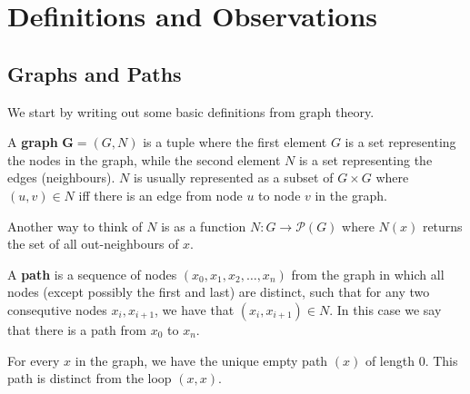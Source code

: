 \section{Definitions and Observations}
\label{sec:Definitions and Observations}
\subsection{Graphs and Paths}
\label{sub:Graphs and Paths}
We start by writing out some basic definitions from graph theory.
\begin{definition}
  A \textbf{graph} $\bm{G} = (G, N)$ is a tuple where the first element $G$ is a set representing the nodes in the graph, while the second element $N$ is a set representing the edges (neighbours).
  $N$ is usually represented as a subset of $G \times G$ where $(u,v) \in N$ iff there is an edge from node $u$ to node $v$ in the graph.
\end{definition}
Another way to think of $N$ is as a function $N: G \rightarrow \mathcal{P}(G)$ where $N(x)$ returns the set of all out-neighbours of $x$.
\begin{definition}
  A \textbf{path} is a sequence of nodes $(x_0, x_1, x_2, \dots, x_n)$ from the graph in which all nodes (except possibly the first and last) are distinct, such that for any two consequtive nodes $x_i,x_{i+1}$, we have that $(x_i, x_{i+1}) \in N$.
  In this case we say that there is a path from $x_0$ to $x_n$.
\end{definition}
For every $x$ in the graph, we have the unique empty path $(x)$ of length 0.
This path is distinct from the loop $(x,x)$.
